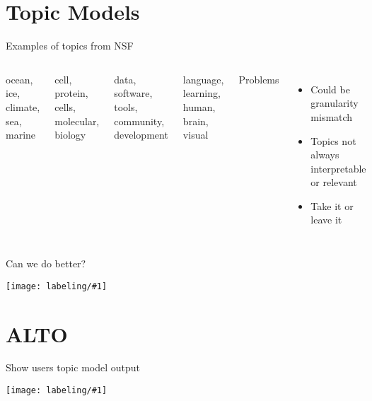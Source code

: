 \documentclass[compress]{beamer}
\newcommand{\gfx}[2]{
\begin{center}
	\texttt{[image: labeling/\#1]}
\end{center}
}
\begin{document}
\section{Topic Models}

\begin{frame}{Examples of topics from NSF}

\begin{columns}


\begin{block}{}
ocean, ice, climate, sea, marine
\end{block}

\begin{block}{}
cell, protein, cells, molecular, biology
\end{block}

\begin{block}{}
data, software, tools, community, development
\end{block}

\begin{block}{}
language, learning, human, brain, visual
\end{block}

\pause

Problems
\begin{itemize}
 \item Could be granularity mismatch
  \item Topics not always interpretable or relevant
  \item Take it or leave it
\end{itemize}

\end{columns}

\end{frame}

\begin{frame}{Can we do better?}

\gfx{alto_qc}{.5}

\centering
{}

\end{frame}


\section{ALTO}



\begin{frame}{Show users topic model output}
  \gfx{intro_screen}{.8}
\end{frame}
\end{document}
